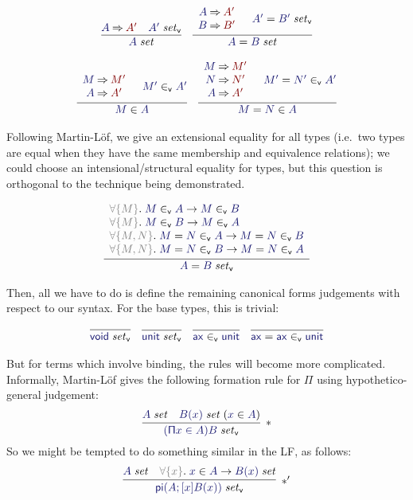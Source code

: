 \documentclass[acmtoplas]{acmtrans2m}
\def\InputModeColorName{MidnightBlue}
\def\OutputModeColorName{Maroon}
\newcommand\InputMode[1]{{\color{\InputModeColorName}{#1}}}
\newcommand\OutputMode[1]{{\color{\OutputModeColorName}{#1}}}
\newcommand\tyvoid{\mathsf{void}}
\newcommand\tyunit{\mathsf{unit}}
\newcommand\ax{\mathsf{ax}}
\newcommand\eval[2]{\InputMode{#1}\mathbin{\Rightarrow}\OutputMode{#2}}
\newcommand\isset[1]{\InputMode{#1}\;\mathit{set}}
\newcommand\eqset[2]{\InputMode{#1}=\InputMode{#2}\;\mathit{set}}
\newcommand\mem[2]{\InputMode{#1}\in\InputMode{#2}}
\newcommand\eqmem[3]{\InputMode{#1}=\InputMode{#2}\in\InputMode{#3}}
\newcommand\canset[1]{\InputMode{#1}\;\mathit{set}_\mathsf{v}}
\newcommand\eqcanset[2]{\InputMode{#1}=\InputMode{#2}\;\mathit{set}_\mathsf{v}}
\newcommand\canmem[2]{\InputMode{#1}\in_\mathsf{v}\InputMode{#2}}
\newcommand\eqcanmem[3]{\InputMode{#1}=\InputMode{#2}\in_\mathsf{v}\InputMode{#3}}
\newcommand\lfpi[2]{{\color{Gray}\forall\{#1\}}.\;#2}
\DeclareMathOperator{\typi}{\mathsf{pi}}
\begin{document}
\begin{gather*}
  \infer{
    \isset{A}
  }{
    \eval{A}{A'} &
    \canset{A'}
  }\quad
  \infer{
    \eqset{A}{B}
  }{
    \begin{array}{c}
      \eval{A}{A'} \\
      \eval{B}{B'}
    \end{array} &
      \eqcanset{A'}{B'}
  }\\[6pt]
  \infer{
    \mem{M}{A}
  }{
    \begin{array}{c}
      \eval{M}{M'}\\
      \eval{A}{A'}
    \end{array} &
    \canmem{M'}{A'}
  }\quad
  \infer{
    \eqmem{M}{N}{A}
  }{
    \begin{array}{c}
      \eval{M}{M'} \\
      \eval{N}{N'} \\
      \eval{A}{A'}
    \end{array} &
    \eqcanmem{M'}{N'}{A'}
  }
\end{gather*}

Following Martin-L\"of, we give an extensional equality for all types (i.e.\
two types are equal when they have the same membership and equivalence
relations); we could choose an intensional/structural equality for types, but
this question is orthogonal to the technique being demonstrated.

\begin{gather*}
  \infer{
    \eqcanset{A}{B}
  }{
    \begin{array}{l}
      \lfpi{M}{\canmem{M}{A}\to\canmem{M}{B}}\\
      \lfpi{M}{\canmem{M}{B}\to\canmem{M}{A}}\\
      \lfpi{M,N}{\eqcanmem{M}{N}{A}\to\eqcanmem{M}{N}{B}}\\
      \lfpi{M,N}{\eqcanmem{M}{N}{B}\to\eqcanmem{M}{N}{A}}
    \end{array}
  }
\end{gather*}

Then, all we have to do is define the remaining canonical forms judgements with
respect to our syntax. For the base types, this is trivial:

\begin{gather*}
  \infer{
    \canset\tyvoid
  }{
  }\quad
  \infer{
    \canset\tyunit
  }{
  }\quad
  \infer{
    \canmem\ax\tyunit
  }{
  }\quad
  \infer{
    \eqcanmem\ax\ax\tyunit
  }{
  }
\end{gather*}

But for terms which involve binding, the rules will become more complicated.
Informally, Martin-L\"of gives the following formation rule for $\mathsf\Pi$
using hypothetico-general judgement:
\[
  \infer[*]{
    \canset{(\mathsf{\Pi}x\in A)B}
  }{
    \isset{A} &
    \isset{B(x)}\;(\mem{x}{A})
  }
\]
So we might be tempted to do something similar in the LF, as follows:
\[
  \infer[*']{
    \canset{\typi(A;[x]B(x))}
  }{
    \isset{A} &
    \lfpi{x}\mem{x}{A}\to\isset{B(x)}
  }
\]
\end{document}
